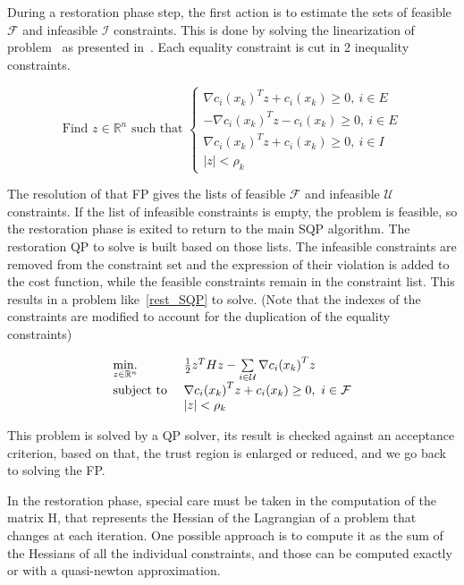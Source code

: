 During a restoration phase step, the first action is to estimate the sets of feasible $\mathcal{F}$ and infeasible $\mathcal{I}$ constraints.
This is done by solving the linearization of problem~ as presented in~.
Each equality constraint is cut in 2 inequality constraints.

\begin{equation}
  \text{Find $z\in\mathbb{R}^n$ such that }
  \left\{
  \begin{array}{l}
    {\nabla c_i(x_k)}^T z+c_i(x_k)\geq 0,\ i\in E \\
    -{\nabla c_i(x_k)}^T z-c_i(x_k)\geq 0,\ i\in E \\
    {\nabla c_i(x_k)}^T z+c_i(x_k)\geq 0,\ i\in I\\
    |z|<\rho_k
  \end{array}
  \right.
\label{eq:FP}
\end{equation}

The resolution of that FP gives the lists of feasible $\mathcal{F}$ and infeasible $\mathcal{U}$ constraints.
If the list of infeasible constraints is empty, the problem is feasible, so the restoration phase is exited to return to the main SQP algorithm.
The restoration QP to solve is built based on those lists.
The infeasible constraints are removed from the constraint set and the expression of their violation is added to the cost function, while the feasible constraints remain in the constraint list.
This results in a problem like~\ref{rest_SQP} to solve.
(Note that the indexes of the constraints are modified to account for the duplication of the equality constraints)

\begin{equation}
  \begin{array}{ll}
    \operatorname*{min.}\limits_{z\in \mathbb{R}^n}{} & \frac{1}{2} z^T Hz - \sum\limits_{i\in\mathcal{U}}{\nabla c_i(x_k)}^T z \\
    \text{subject to } & {\nabla c_i(x_k)}^T z+c_i(x_k)\geq 0,\ i \in \mathcal{F} \\
                       & |z|<\rho_k
  \end{array}
\label{rest_SQP}
\end{equation}

This problem is solved by a QP solver, its result is checked against an acceptance criterion, based on that, the trust region is enlarged or reduced, and we go back to solving the FP\@.

In the restoration phase, special care must be taken in the computation of the matrix H, that represents the Hessian of the Lagrangian of a problem that changes at each iteration.
One possible approach is to compute it as the sum of the Hessians of all the individual constraints, and those can be computed exactly or with a quasi-newton approximation.


